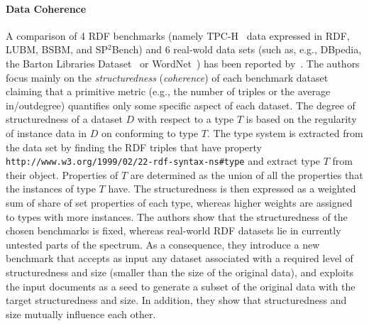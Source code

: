 \paragraph{Data Coherence}  A comparison of 4 RDF benchmarks (namely TPC-H~\cite{TPC-H} data expressed in RDF, LUBM, BSBM, and SP$^2$Bench) and 6 real-wold data sets (such as, e.g.,  DBpedia, the Barton Libraries Dataset~\cite{barton-benchmark} or
WordNet~\cite{Miller:1995:WLD:219717.219748}) has been reported by~\cite{Duan:2011:AOC:1989323.1989340}. The authors focus mainly on the  \emph{structuredness} (\emph{coherence}) of each benchmark dataset claiming that a primitive metric (e.g., the number of triples or the average in/outdegree) quantifies only some specific aspect of each dataset. The degree of structuredness of a dataset $D$ with respect to a type $T$ is based on  the regularity of instance data in $D$ on conforming to type $T$. The type system is extracted from the data set by finding the RDF triples that have property  \texttt{http://www.w3.org/1999/02/22-rdf-syntax-ns\#type} and extract type $T$ from their object. Properties of $T$ are determined as the union of all the properties that the instances of type $T$ have. The structuredness is then expressed as a weighted sum of share of set properties of each type, whereas higher weights are assigned to types with more instances. The authors show that the structuredness of the chosen benchmarks is fixed, whereas real-world RDF datasets lie in currently untested parts of the spectrum. As a consequence, they introduce a new benchmark that accepts as input any dataset associated with a required level of structuredness and size (smaller than the size of the original data), and exploits the input documents as a seed to generate a subset of the original data with the target structuredness and size. In addition, they show that structuredness and size mutually influence each other.


